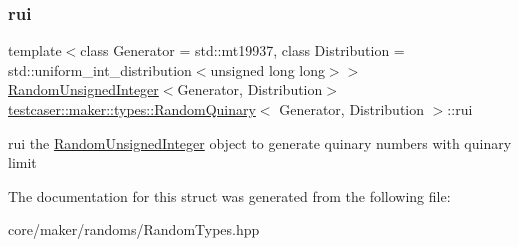 \subsubsection{\texorpdfstring{rui}{rui}}
{\footnotesize\ttfamily template$<$class Generator = std\+::mt19937, class Distribution = std\+::uniform\+\_\+int\+\_\+distribution$<$unsigned long long$>$$>$ \\
\mbox{\hyperlink{classtestcaser_1_1maker_1_1types_1_1RandomUnsignedInteger}{Random\+Unsigned\+Integer}}$<$Generator, Distribution$>$ \mbox{\hyperlink{structtestcaser_1_1maker_1_1types_1_1RandomQuinary}{testcaser\+::maker\+::types\+::\+Random\+Quinary}}$<$ Generator, Distribution $>$\+::rui}



rui the \mbox{\hyperlink{classtestcaser_1_1maker_1_1types_1_1RandomUnsignedInteger}{Random\+Unsigned\+Integer}} object to generate quinary numbers with quinary limit 



The documentation for this struct was generated from the following file\+:\begin{DoxyCompactItemize}
\item 
core/maker/randoms/Random\+Types.\+hpp\end{DoxyCompactItemize}
